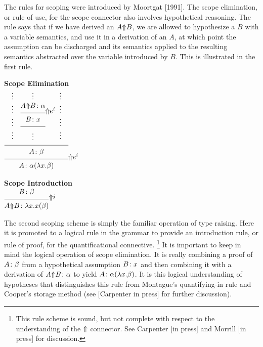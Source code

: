 The rules for scoping were introduced by Moortgat [1991].  The scope
elimination, or rule of use, for the scope connector also involves
hypothetical reasoning.  
The rule says that if we have derived an $A{\Uparrow}B$, we
are allowed to hypothesize a $B$ with a variable semantics, and use it
in a derivation of an $A$, at which point the assumption can be
discharged and its semantics applied to the resulting semantics
abstracted over the variable introduced by $B$.  This is illustrated
in the first rule.
%
\begin{center}
{\bf Scope Elimination} \\[6pt]
{\small
$\infr{\infr{\quad \sstc{\vdots \\ \vdots \\ \vdots \\ \vdots}
             \quad \infr{\infr{\dotsover{\synsem{\scop{A}{B}}{\alpha}}}
                              {\synsem{B}{x}}
                              {\scopr{i}}
                        }
                        {\vdots}
                        {}
             \qquad \sstc{\vdots \\ \vdots \\ \vdots \\ \vdots}
             \quad
            }
            {\synsem{A}{\beta}}
            {}
      }
      {\synsem{A}{\alpha(\lam{x}{\beta})}}
      {\scopr{i}}$
}
\end{center}
\begin{center}
{\bf Scope Introduction} \\[6pt]
{\small
$\infr{\synsem{B}{\beta}}
      {\synsem{\scop{A}{B}}{\lam{x}{x(\beta)}}}
      {\scin}$
}
\end{center}
%
The second scoping scheme is simply the familiar operation of type
raising.  Here it is promoted to a logical rule in the grammar to
provide an introduction rule, or rule of proof, for the
quantificational connective.%
%
\footnote{This rule scheme is sound, but not complete with respect to
the understanding of the ${\Uparrow}$ connector.  See Carpenter [in
press] and Morrill [in press] for discussion.}
%
It is important to keep in mind the logical operation of scope
elimination.  It is really combining a proof of $A\/\colon \beta$
from a hypothetical assumption $B\/\colon x$ and then combining it
with a derivation of $A{\Uparrow}B\/\colon \alpha$ to yield
$A\/\colon \alpha(\lambda x . \beta)$.  It is this logical
understanding of hypotheses that distinguishes this rule from
Montague's quantifying-in rule and Cooper's storage method (see
[Carpenter in press] for further discussion).

